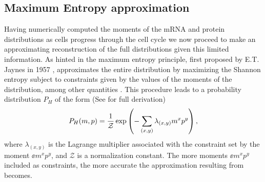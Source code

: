 \subsection{Maximum Entropy approximation}\label{sec_maxent}

Having numerically computed the moments of the mRNA and protein distributions
as cells progress through the cell cycle we now proceed to make an
approximating reconstruction of the full distributions given this limited
information. As hinted in  the maximum entropy principle,
first proposed by E.T. Jaynes in 1957 \cite{Jaynes1957}, approximates the
entire distribution by maximizing the Shannon entropy subject to constraints
given by the values of the moments of the distribution, among other quantities
\cite{Jaynes1957}. This procedure leads to a probability distribution $P_H$ of
the form (See
 for full derivation)
\begin{equation}
  P_H(m, p) = {1 \over \mathcal{Z}}
              \exp \left( - \sum_{(x,y)} \lambda_{(x,y)} m^x p^y \right),
  \label{eq_maxEnt_joint}
\end{equation}
where $\lambda_{(x,y)}$ is the Lagrange multiplier associated with the
constraint set by the moment $\ee{m^x p^y}$, and $\mathcal{Z}$ is a
normalization constant. The more moments $\ee{m^x p^y}$ included as
constraints, the more accurate the approximation resulting from
 becomes.

